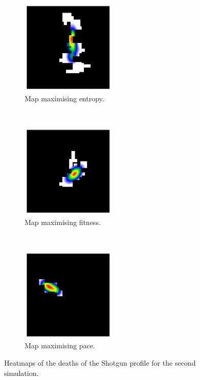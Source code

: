 \begin{figure}[H]
    \centering
    \begin{subfigure}[t]{0.3\textwidth}
        \centering
        \includegraphics[height=4.5cm]{Images/images/experiment_two/best_entropy_pop_1/deaths_bot_0.png}
        \caption{Map maximising entropy.}
    \end{subfigure}%
    ~ 
    \begin{subfigure}[t]{0.3\textwidth}
        \centering
        \includegraphics[height=4.5cm]{Images/images/experiment_two/best_fitness_pop_1/deaths_bot_0.png}
        \caption{Map maximising fitness.}
    \end{subfigure}
    ~ 
    \begin{subfigure}[t]{0.3\textwidth}
        \centering
        \includegraphics[height=4.5cm]{Images/images/experiment_two/best_pace_pop_1/deaths_bot_0.png}
        \caption{Map maximising pace.}
    \end{subfigure}
    \caption{Heatmaps of the deaths of the Shotgun profile for the second simulation.}
\end{figure}
